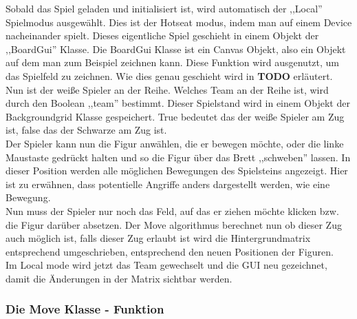 \documentclass[12pt,a4paper]{article}
\begin{document}
{Sobald das Spiel geladen und initialisiert ist, wird automatisch der ,,Local'' Spielmodus ausgewählt. Dies ist der Hotseat modus, indem man auf einem Device nacheinander spielt. Dieses eigentliche Spiel geschieht in einem Objekt der ,,BoardGui'' Klasse. Die BoardGui Klasse ist ein Canvas Objekt, also ein Objekt auf dem man zum Beispiel zeichnen kann. Diese Funktion wird ausgenutzt, um das Spielfeld zu zeichnen. Wie dies genau geschieht wird in \textbf{TODO} erläutert.  \\
Nun ist der weiße Spieler an der Reihe. Welches Team an der Reihe ist, wird durch den Boolean ,,team'' bestimmt. Dieser Spielstand wird in einem Objekt der Backgroundgrid Klasse gespeichert. True bedeutet das der weiße Spieler am Zug ist, false das der Schwarze am Zug ist. \\
Der Spieler kann nun die Figur anwählen, die er bewegen möchte, oder die linke Maustaste gedrückt halten und so die Figur über das Brett ,,schweben'' lassen. In dieser Position werden alle möglichen Bewegungen des Spielsteins angezeigt. Hier ist zu erwähnen, dass potentielle Angriffe anders dargestellt werden, wie eine Bewegung. \\
Nun muss der Spieler nur noch das Feld, auf das er ziehen möchte klicken bzw. die Figur darüber absetzen. Der Move algorithmus berechnet nun ob dieser Zug auch möglich ist, falls dieser Zug erlaubt ist wird die Hintergrundmatrix entsprechend umgeschrieben, entsprechend den neuen Positionen der Figuren. \\
Im Local mode wird jetzt das Team gewechselt und die GUI neu gezeichnet, damit die Änderungen in der Matrix sichtbar werden. 

\subsubsection{Die Move Klasse - Funktion}
\label{SUBSUBSEC:MOVE}

}
\end{document}
